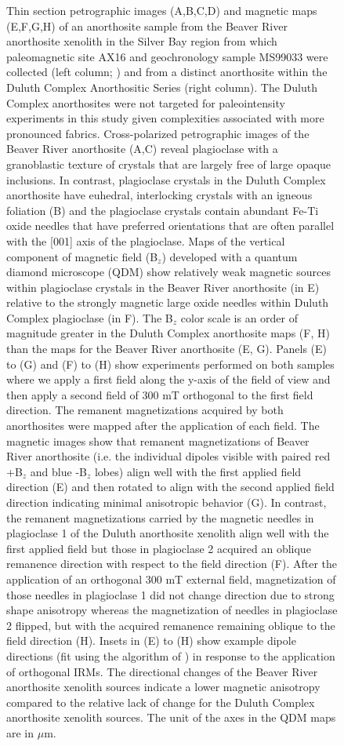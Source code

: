\begin{figure}
\caption[Petrographic images and magnetic field maps of anorthosite samples from the Beaver Bay Complex and the Duluth Complex]{\tiny Thin section petrographic images (A,B,C,D) and magnetic maps (E,F,G,H) of an anorthosite sample from the Beaver River anorthosite xenolith in the Silver Bay region from which paleomagnetic site AX16 and geochronology sample MS99033 were collected (left column;  \citealp{Zhang2021b}) and from a distinct anorthosite within the Duluth Complex Anorthositic Series (right column). The Duluth Complex anorthosites were not targeted for paleointensity experiments in this study given complexities associated with more pronounced fabrics. Cross-polarized petrographic images of the Beaver River anorthosite (A,C) reveal plagioclase with a granoblastic texture of crystals that are largely free of large opaque inclusions. In contrast, plagioclase crystals in the Duluth Complex anorthosite have euhedral, interlocking crystals with an igneous foliation (B) and the plagioclase crystals contain abundant Fe-Ti oxide needles that have preferred orientations that are often parallel with the [001] axis of the plagioclase. Maps of the vertical component of magnetic field (B$_z$) developed with a quantum diamond microscope (QDM) show relatively weak magnetic sources within plagioclase crystals in the Beaver River anorthosite (in E) relative to the strongly magnetic large oxide needles within Duluth Complex plagioclase (in F). The B$_z$ color scale is an order of magnitude greater in the Duluth Complex anorthosite maps (F, H) than the maps for the Beaver River anorthosite (E, G). Panels (E) to (G) and (F) to (H) show experiments performed on both samples where we apply a first field along the y-axis of the field of view and then apply a second field of 300 mT orthogonal to the first field direction. The remanent magnetizations acquired by both anorthosites were mapped after the application of each field. The magnetic images show that remanent magnetizations of Beaver River anorthosite (i.e. the individual dipoles visible with paired red +B$_z$ and blue -B$_z$ lobes) align well with the first applied field direction (E) and then rotated to align with the second applied field direction indicating minimal anisotropic behavior (G). In contrast, the remanent magnetizations carried by the magnetic needles in plagioclase 1 of the Duluth anorthosite xenolith align well with the first applied field but those in plagioclase 2 acquired an oblique remanence direction with respect to the field direction (F). After the application of an orthogonal 300 mT external field, magnetization of those needles in plagioclase 1 did not change direction due to strong shape anisotropy whereas the magnetization of needles in plagioclase 2 flipped, but with the acquired remanence remaining oblique to the field direction (H). Insets in (E) to (H) show example dipole directions (fit using the algorithm of \citep{Lima2016a}) in response to the application of orthogonal IRMs. The directional changes of the Beaver River anorthosite xenolith sources indicate a lower magnetic anisotropy compared to the relative lack of change for the Duluth Complex anorthosite xenolith sources. The unit of the axes in the QDM maps are in $\mu$m.}
\label{fig:Petro_QDM}
\end{figure}

